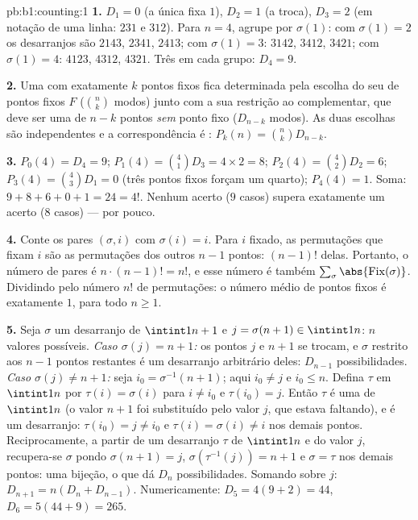 \begin{solution}{pb:b1:counting:1}
\textbf{1.} $D_1 = 0$ (a única  fixa $1$), $D_2 = 1$
(a troca), $D_3 = 2$ (em notação de uma linha: $231$ e $312$). Para
$n = 4$, agrupe por $\sigma(1)$: com $\sigma(1) = 2$ os desarranjos
são $2143$, $2341$, $2413$; com $\sigma(1) = 3$: $3142$, $3412$,
$3421$; com $\sigma(1) = 4$: $4123$, $4312$, $4321$. Três em cada
grupo: $D_4 = 9$.

\textbf{2.} Uma  com exatamente $k$ pontos fixos fica
determinada pela escolha do seu  de pontos fixos $F$ ($\binom nk$
modos) junto com a sua restrição ao complementar, que deve
ser uma  de $n - k$ pontos \emph{sem} ponto fixo
($D_{n-k}$ modos). As duas escolhas são independentes e a
correspondência é : $P_k(n) = \binom nk D_{n-k}$.

\textbf{3.} $P_0(4) = D_4 = 9$; $P_1(4) = \binom41 D_3 = 4 \times 2
= 8$; $P_2(4) = \binom42 D_2 = 6$; $P_3(4) = \binom43 D_1 = 0$
(três pontos fixos forçam um quarto); $P_4(4) = 1$. Soma: $9 + 8 + 6
+ 0 + 1 = 24 = 4!$. Nenhum acerto ($9$ casos) supera exatamente um acerto
($8$ casos) --- por pouco.

\textbf{4.} Conte os pares $(\sigma, i)$ com $\sigma(i) = i$. Para
$i$ fixado, as permutações que fixam $i$ são as permutações dos
outros $n - 1$ pontos: $(n-1)!$ delas. Portanto, o número de pares
é $n \cdot (n-1)! = n!$, e esse número é também
$\sum_\sigma \abs{\mathrm{Fix}(\sigma)}$. Dividindo pelo número
$n!$ de permutações: o número médio de pontos fixos é
exatamente $1$, para todo $n \geq 1$.

\textbf{5.} Seja $\sigma$ um desarranjo de $\intint1{n+1}$ e
$j = \sigma(n+1) \in \intint1n$: $n$ valores possíveis. \emph{Caso
$\sigma(j) = n+1$:} os pontos $j$ e $n+1$ se trocam, e $\sigma$
restrito aos $n - 1$ pontos restantes é um desarranjo arbitrário
deles: $D_{n-1}$ possibilidades. \emph{Caso $\sigma(j)
\neq n+1$:} seja $i_0 = \sigma^{-1}(n+1)$; aqui $i_0 \neq j$ e
$i_0 \leq n$. Defina $\tau$ em $\intint1n$ por $\tau(i) = \sigma(i)$
para $i \neq i_0$ e $\tau(i_0) = j$. Então $\tau$ é uma 
de $\intint1n$ (o valor $n+1$ foi substituído pelo valor $j$, que
estava faltando), e é um desarranjo: $\tau(i_0) = j \neq i_0$ e
$\tau(i) = \sigma(i) \neq i$ nos demais pontos. Reciprocamente, a partir de um
desarranjo $\tau$ de $\intint1n$ e do valor $j$, recupera-se
$\sigma$ pondo $\sigma(n+1) = j$, $\sigma(\tau^{-1}(j)) = n+1$
e $\sigma = \tau$ nos demais pontos: uma bijeção, o que dá $D_n$
possibilidades. Somando sobre $j$: $D_{n+1} = n(D_n + D_{n-1})$.
Numericamente: $D_5 = 4(9 + 2) = 44$, $D_6 = 5(44 + 9) = 265$.


\end{solution}
